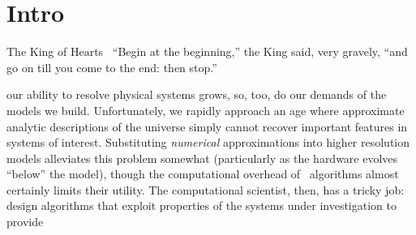 \chapter{\label{ch:intro}Intro}

\begin{frontquote}{The King of Hearts~\cite{wonderland}}
``Begin at the beginning,'' the King said, very gravely, ``and go on till you come to the end: then stop.''
\end{frontquote}

 our ability to resolve physical systems grows, so, too, do our demands of the models we build.
Unfortunately, we rapidly approach an age where approximate analytic descriptions of the universe simply cannot recover important features in systems of interest.
Substituting \emph{numerical} approximations into higher resolution models alleviates this problem somewhat (particularly as the hardware evolves ``below'' the model), though the computational overhead of \naive\ algorithms almost certainly limits their utility.
The computational scientist, then, has a tricky job: design algorithms that exploit properties of the systems under investigation to provide
